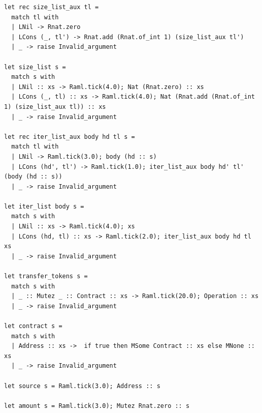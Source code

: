 \documentclass{kuisthesis}
\begin{document}
\begin{lstlisting}[language=caml]
let rec size_list_aux tl =
  match tl with
  | LNil -> Rnat.zero
  | LCons (_, tl') -> Rnat.add (Rnat.of_int 1) (size_list_aux tl')
  | _ -> raise Invalid_argument

let size_list s =
  match s with
  | LNil :: xs -> Raml.tick(4.0); Nat (Rnat.zero) :: xs
  | LCons (_, tl) :: xs -> Raml.tick(4.0); Nat (Rnat.add (Rnat.of_int 1) (size_list_aux tl)) :: xs
  | _ -> raise Invalid_argument

let rec iter_list_aux body hd tl s =
  match tl with
  | LNil -> Raml.tick(3.0); body (hd :: s)
  | LCons (hd', tl') -> Raml.tick(1.0); iter_list_aux body hd' tl' (body (hd :: s))
  | _ -> raise Invalid_argument

let iter_list body s =
  match s with
  | LNil :: xs -> Raml.tick(4.0); xs
  | LCons (hd, tl) :: xs -> Raml.tick(2.0); iter_list_aux body hd tl xs
  | _ -> raise Invalid_argument

let transfer_tokens s =
  match s with
  | _ :: Mutez _ :: Contract :: xs -> Raml.tick(20.0); Operation :: xs
  | _ -> raise Invalid_argument

let contract s =
  match s with
  | Address :: xs ->  if true then MSome Contract :: xs else MNone :: xs
  | _ -> raise Invalid_argument

let source s = Raml.tick(3.0); Address :: s

let amount s = Raml.tick(3.0); Mutez Rnat.zero :: s
\end{lstlisting}
\end{document}
